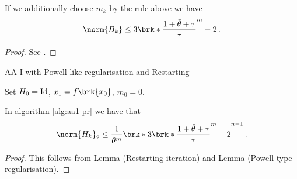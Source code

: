 \begin{frame}
	\begin{lemma}
		If we additionally choose $m_k$ by the rule above we have
		\begin{align*}
			\norm{B_k}\leq 3\brk*{\frac{1+\bartheta+\tau}{\tau}}^m-2\,.
		\end{align*}
	\end{lemma}
	\begin{proof}
		See \cite[Lemma 3]{ZhaAA}.
	\end{proof}
\end{frame}

\begin{frame}
	\begin{algorithm}[H]
	\caption{AA-I with Powell-like-regularisation and Restarting}\label{alg:aa1-pr}
	\color{gray}
	\BlankLine
	Set $H_0=\operatorname{Id}$, $x_1=f\brk{x_0}$, $m_0 = 0$.
	
	\end{algorithm}
\end{frame}

\begin{frame}
	\begin{lemma}
		In algorithm \ref{alg:aa1-pr} we have that
		\begin{align*}
			\norm{H_k}_2\leq \frac{1}{\bartheta^m}\brk*{3\brk*{\frac{1+\bartheta+\tau}{\tau}}^m-2}^{n-1}\,.
		\end{align*}
	\end{lemma}
	\begin{proof}
		This follows from Lemma (Restarting iteration) and Lemma (Powell-type regularisation).
	\end{proof}
\end{frame}

